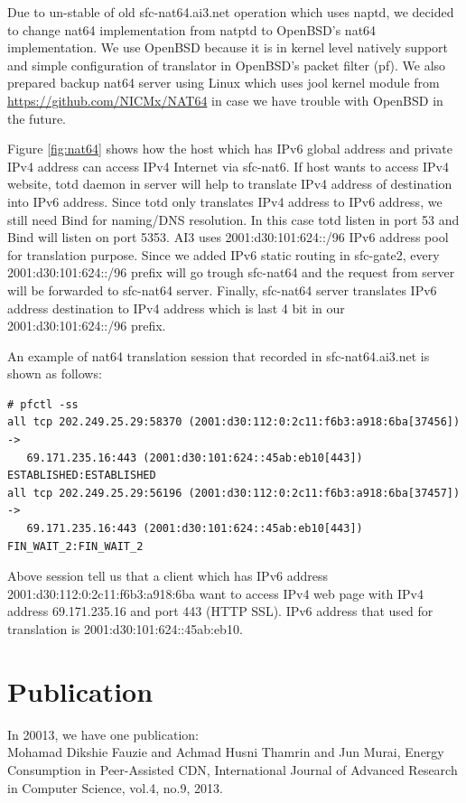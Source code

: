 \documentclass{article}
\begin{document}
Due to un-stable of old sfc-nat64.ai3.net operation which uses naptd, we decided to change nat64 implementation from natptd to OpenBSD's nat64 implementation.  
We use OpenBSD because it is in kernel level natively support and simple configuration of translator in OpenBSD's packet filter (pf).
We also prepared backup nat64 server using Linux which uses jool kernel module from \url{https://github.com/NICMx/NAT64} in case we have trouble with OpenBSD in the future. 

Figure \ref{fig:nat64} shows how the host which has IPv6 global address and private IPv4 address can access IPv4 Internet via sfc-nat6. 
If host wants to access IPv4 website, totd daemon in server will help to translate IPv4 address of destination into IPv6 address. 
Since totd only translates IPv4 address to IPv6 address, we still need Bind for naming/DNS resolution. 
In this case totd listen in port 53 and Bind will listen on port 5353. 
AI3 uses 2001:d30:101:624::/96 IPv6 address pool for translation purpose.  
Since we added IPv6 static routing in sfc-gate2, every 2001:d30:101:624::/96 prefix will go trough sfc-nat64 and the request from server will be forwarded to sfc-nat64 server. 
Finally, sfc-nat64 server translates IPv6 address destination to IPv4 address which is last 4 bit in our  2001:d30:101:624::/96 prefix.   

An example of nat64 translation session that recorded in sfc-nat64.ai3.net is shown as follows:  
\begin{verbatim}
# pfctl -ss     
all tcp 202.249.25.29:58370 (2001:d30:112:0:2c11:f6b3:a918:6ba[37456]) -> 
   69.171.235.16:443 (2001:d30:101:624::45ab:eb10[443]) ESTABLISHED:ESTABLISHED
all tcp 202.249.25.29:56196 (2001:d30:112:0:2c11:f6b3:a918:6ba[37457]) -> 
   69.171.235.16:443 (2001:d30:101:624::45ab:eb10[443]) FIN_WAIT_2:FIN_WAIT_2
\end{verbatim}

Above session tell us that a client which has IPv6 address 2001:d30:112:0:2c11:f6b3:a918:6ba want to access IPv4 web page with IPv4 address 69.171.235.16 and port 443 (HTTP SSL).  
IPv6 address that used for translation is 2001:d30:101:624::45ab:eb10.  

\section{Publication}
In 20013, we have one publication: \\
Mohamad Dikshie Fauzie and Achmad Husni Thamrin and Jun Murai, Energy Consumption in Peer-Assisted CDN, International Journal of Advanced Research in Computer Science, vol.4, no.9, 2013.  \\
\end{document}
